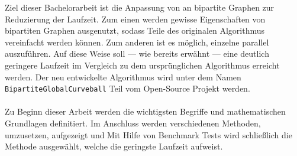 Ziel dieser Bachelorarbeit ist die Anpassung von \gc{} an bipartite Graphen zur 
Reduzierung der Laufzeit. Zum einen werden gewisse 
Eigenschaften von bipartiten Graphen ausgenutzt, sodass Teile des originalen \gc{} Algorithmus
vereinfacht werden können. Zum anderen ist es möglich, einzelne  parallel auszuführen.
Auf diese Weise soll --- wie bereits erwähnt --- eine deutlich geringere Laufzeit im Vergleich zu dem ursprünglichen \gc{}
Algorithmus erreicht werden.
Der neu entwickelte Algorithmus wird unter dem Namen \texttt{BipartiteGlobalCurveball} 
Teil vom Open-Source Projekt \nk{} werden.
\\
\\
\newpage
Zu Beginn dieser Arbeit werden die wichtigsten Begriffe und mathematischen Grundlagen definitiert.
Im Anschluss werden verschiedenen Methoden, \gc{} umzusetzen,  aufgezeigt und  
Mit Hilfe von Benchmark Tests wird schließlich die Methode ausgewählt, welche die geringste Laufzeit 
aufweist.
